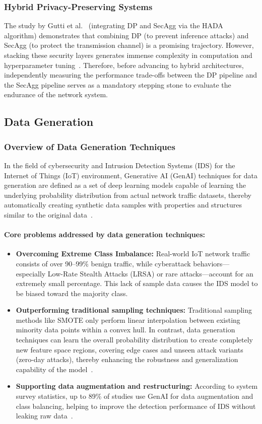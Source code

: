 \subsubsection*{Hybrid Privacy-Preserving Systems}
The study by Gutti et al.~\cite{gutti2024} (integrating DP and SecAgg via the HADA algorithm) demonstrates that combining DP (to prevent inference attacks) and SecAgg (to protect the transmission channel) is a promising trajectory. However, stacking these security layers generates immense complexity in computation and hyperparameter tuning~\cite{gutti2024}. Therefore, before advancing to hybrid architectures, independently measuring the performance trade-offs between the DP pipeline and the SecAgg pipeline serves as a mandatory stepping stone to evaluate the endurance of the network system.

\subsection{Data Generation}

\subsubsection{Overview of Data Generation Techniques}
In the field of cybersecurity and Intrusion Detection Systems (IDS) for the Internet of Things (IoT) environment, Generative AI (GenAI) techniques for data generation are defined as a set of deep learning models capable of learning the underlying probability distribution from actual network traffic datasets, thereby automatically creating synthetic data samples with properties and structures similar to the original data~\cite{deng2025}.

\paragraph{Core problems addressed by data generation techniques:}
\begin{itemize}
    \item \textbf{Overcoming Extreme Class Imbalance:} Real-world IoT network traffic consists of over 90--99\% benign traffic, while cyberattack behaviors---especially Low-Rate Stealth Attacks (LRSA) or rare attacks---account for an extremely small percentage. This lack of sample data causes the IDS model to be biased toward the majority class.
    \item \textbf{Outperforming traditional sampling techniques:} Traditional sampling methods like SMOTE only perform linear interpolation between existing minority data points within a convex hull. In contrast, data generation techniques can learn the overall probability distribution to create completely new feature space regions, covering edge cases and unseen attack variants (zero-day attacks), thereby enhancing the robustness and generalization capability of the model~\cite{deng2025}.
    \item \textbf{Supporting data augmentation and restructuring:} According to system survey statistics, up to 89\% of studies use GenAI for data augmentation and class balancing, helping to improve the detection performance of IDS without leaking raw data~\cite{deng2025}.
\end{itemize}

